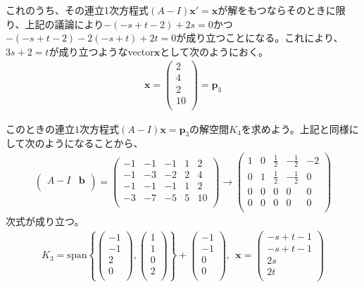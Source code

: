 \documentclass[dvipdfmx]{jsarticle}
\begin{document}
これのうち、その連立1次方程式$(A - I)\mathbf{x}' = \mathbf{x}$が解をもつならそのときに限り、上記の議論により$- ( - s + t - 2) + 2s = 0$かつ$- ( - s + t - 2) - 2( - s + t) + 2t = 0$が成り立つことになる。これにより、$3s + 2 = t$が成り立つようなvector$\mathbf{x}$として次のようにおく。
\begin{align*}
\mathbf{x} = \begin{pmatrix}
2 \\
4 \\
2 \\
10 \\
\end{pmatrix} = \mathbf{p}_{3}
\end{align*}\par
このときの連立$1$次方程式$(A - I)\mathbf{x} = \mathbf{p}_{3}$の解空間$K_{4}$を求めよう。上記と同様にして次のようになることから、
\begin{align*}
\begin{pmatrix}
A - I & \mathbf{b} \\
\end{pmatrix} = \begin{pmatrix}
 - 1 & - 1 & - 1 & 1 & 2 \\
 - 1 & - 3 & - 2 & 2 & 4 \\
 - 1 & - 1 & - 1 & 1 & 2 \\
 - 3 & - 7 & - 5 & 5 & 10 \\
\end{pmatrix} \rightarrow \begin{pmatrix}
1 & 0 & \frac{1}{2} & - \frac{1}{2} & - 2 \\
0 & 1 & \frac{1}{2} & - \frac{1}{2} & 0 \\
0 & 0 & 0 & 0 & 0 \\
0 & 0 & 0 & 0 & 0 \\
\end{pmatrix}
\end{align*}
次式が成り立つ。
\begin{align*}
K_{3} = {\mathrm{span}}\left\{ \begin{pmatrix}
 - 1 \\
 - 1 \\
2 \\
0 \\
\end{pmatrix},\begin{pmatrix}
1 \\
1 \\
0 \\
2 \\
\end{pmatrix} \right\} + \begin{pmatrix}
 - 1 \\
 - 1 \\
0 \\
0 \\
\end{pmatrix},\ \ \mathbf{x} = \begin{pmatrix}
 - s + t - 1 \\
 - s + t - 1 \\
2s \\
2t \\
\end{pmatrix}
\end{align*}
\end{document}
